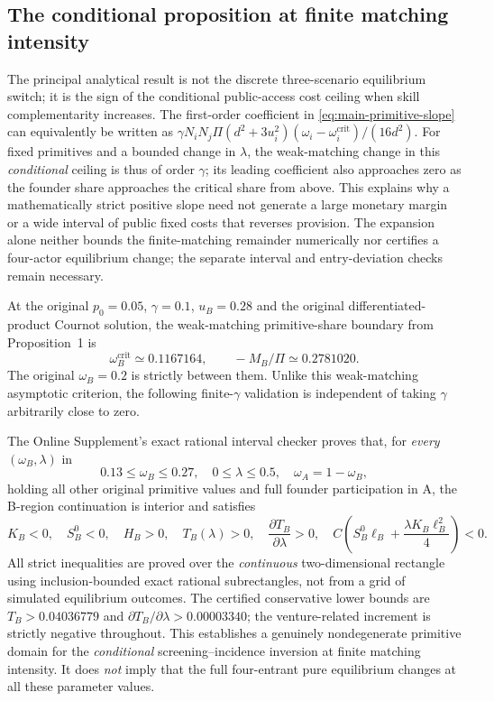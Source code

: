 \subsection{The conditional proposition at finite matching intensity}

The principal analytical result is not the discrete three-scenario equilibrium switch; it is the sign of the conditional public-access cost ceiling when skill complementarity increases. The first-order coefficient in \eqref{eq:main-primitive-slope} can equivalently be written as
$\gamma N_iN_j\Pi(d^2+3u_i^2)(\omega_i-\omega_i^{\mathrm{crit}})/(16d^2)$.
For fixed primitives and a bounded change in $\lambda$, the weak-matching change in this \emph{conditional} ceiling is thus of order $\gamma$; its leading coefficient also approaches zero as the founder share approaches the critical share from above. This explains why a mathematically strict positive slope need not generate a large monetary margin or a wide interval of public fixed costs that reverses provision. The expansion alone neither bounds the finite-matching remainder numerically nor certifies a four-actor equilibrium change; the separate interval and entry-deviation checks remain necessary.

At the original $p_0=0.05$, $\gamma=0.1$, $u_B=0.28$ and the original differentiated-product Cournot solution, the weak-matching primitive-share boundary from Proposition~1 is
\[
 \omega_B^{\mathrm{crit}}\simeq0.1167164,\qquad
 -M_B/\Pi\simeq0.2781020.
\]
The original $\omega_B=0.2$ is strictly between them. Unlike this weak-matching asymptotic criterion, the following finite-$\gamma$ validation is independent of taking $\gamma$ arbitrarily close to zero.

The Online Supplement's exact rational interval checker proves that, for \emph{every} $(\omega_B,\lambda)$ in
\begin{equation}
 0.13\leq\omega_B\leq0.27,\quad
 0\leq\lambda\leq0.5,\quad \omega_A=1-\omega_B,
 \label{eq:inversion-rectangle}
\end{equation}
holding all other original primitive values and full founder participation in A, the B-region continuation is interior and satisfies
\begin{equation}
 K_B<0,\quad S_B^0<0,\quad
 H_B>0,\quad T_B(\lambda)>0,\quad
 \frac{\partial T_B}{\partial\lambda}>0,
 \quad C\left(S_B^0\ell_B+\frac{\lambda K_B\ell_B^2}{4}\right)<0.
 \label{eq:inversion-verified}
\end{equation}
All strict inequalities are proved over the \emph{continuous} two-dimensional rectangle using inclusion-bounded exact rational subrectangles, not from a grid of simulated equilibrium outcomes. The certified conservative lower bounds are $T_B>0.04036779$ and $\partial T_B/\partial\lambda>0.00003340$; the venture-related increment is strictly negative throughout. This establishes a genuinely nondegenerate primitive domain for the \emph{conditional} screening--incidence inversion at finite matching intensity. It does \emph{not} imply that the full four-entrant pure equilibrium changes at all these parameter values.

